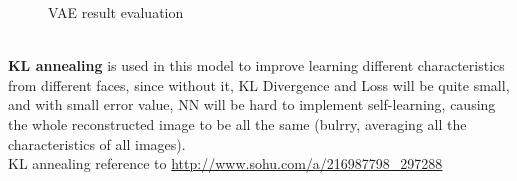 \documentclass[11pt, a4paper]{article} %
\begin{document}
\begin{figure}[H]
    \hfill
    \hfill
    \caption{VAE result evaluation}
\end{figure}
\\ \textbf{KL annealing} is used in this model to improve learning different characteristics from different faces, since without it, KL Divergence and Loss will be quite small, and with small error value, NN will be hard to implement self-learning, causing the whole reconstructed image to be all the same (bulrry, averaging all the characteristics of all images).
\\ KL annealing reference to \url{http://www.sohu.com/a/216987798_297288}
\end{document}

